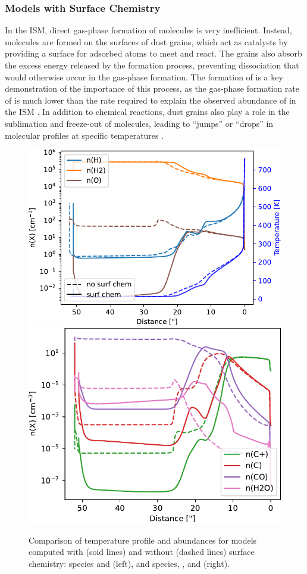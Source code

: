 \documentclass[12pt,a4paper]{article}
\begin{document}
\subsubsection{Models with Surface Chemistry}
In the ISM, direct gas-phase formation of molecules is very inefficient. Instead, molecules are formed on the surfaces of dust grains, which act as catalysts by providing a surface for adsorbed atoms to meet and react. The grains also absorb the excess energy released by the formation process, preventing dissociation that would otherwise occur in the gas-phase formation. The formation of  is a key demonstration of the importance of this process, as the gas-phase formation rate of  is much lower than the rate required to explain the observed abundance of  in the ISM \parencite{Gould1963,Hollenbach1971}. In addition to chemical reactions, dust grains also play a role in the sublimation and freeze-out of molecules, leading to “jumps” or “drops” in molecular profiles at specific temperatures \parencite{Herbst2009}.

\begin{figure}[hb]
    \centering
    \includegraphics[width=.52\textwidth,keepaspectratio]{cmpsurfb_H_O.pdf}
    \includegraphics[width=.47\textwidth,keepaspectratio]{cmpsurfb_CO_H2O.pdf}
    \caption{Comparison of temperature profile and abundances for models computed with (soid lines) and without (dashed lines) surface chemistry:  species and  (left), and  species, , and  (right).} \label{fig:cmpsurfb}
\end{figure}
\end{document}

